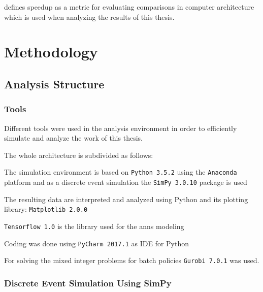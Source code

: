 \documentclass[draft=false]{seal_thesis}
\begin{document}
\citet{Milo2012} defines speedup as a metric for evaluating comparisons in computer architecture which is used when analyzing the results of this thesis.

\glsresetall

\chapter{Methodology}
\label{ch:methodology}

\section{Analysis Structure}
\subsection{Tools}
Different tools were used in the analysis environment in order to efficiently simulate and analyze the work of this thesis.

The whole architecture is subdivided as follows:
\begin{enumerate*}
	\item The simulation environment is based on \texttt{Python 3.5.2} using the \texttt{Anaconda} platform and as a discrete event simulation the \texttt{SimPy 3.0.10} package is used
	\item The resulting data are interpreted and analyzed using Python and its plotting library: \texttt{Matplotlib 2.0.0}
	\item \texttt{Tensorflow 1.0} is the library used for the \glspl{ann} modeling
	\item Coding was done using \texttt{PyCharm 2017.1} as IDE for Python
	\item For solving the mixed integer problems for batch policies \texttt{Gurobi 7.0.1} was used.
\end{enumerate*}

\subsection{Discrete Event Simulation Using SimPy}
\label{subsec:discrete_event_sim}
\end{document}
